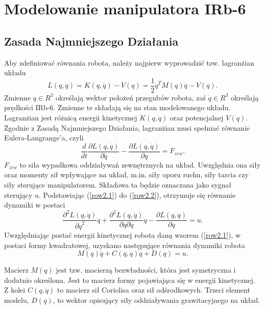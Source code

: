\documentclass[eng,printmode]{mgr}
\begin{document}
\chapter{Modelowanie manipulatora IRb-6}

\section{Zasada Najmniejszego Działania}



Aby zdefiniować równania robota, należy najpierw wyprowadzić tzw. lagranżian układu
\begin{equation}\label{row2.1}
L(q,\dot{q})=K(q,\dot{q})-V(q)=\frac{1}{2}\dot{q}^TM(q)\dot{q}-V(q).
\end{equation}
Zmienne $q ∈ R^3$ określają wektor położeń przegubów robota, zaś  $\dot{q} ∈ R^3 $ określają prędkości IRb-6. Zmienne te składają się na stan modelowanego układu. Lagranżian jest różnicą energii kinetycznej $K(q,\dot{q})$ oraz potencjalnej $V(q)$. Zgodnie z Zasadą Najmniejszego Działania, lagranżian musi spełniać równanie Eulera-Langrange'a, czyli
\begin{equation}\label{row2.2}
\frac{d}{dt}  \frac{∂L(q,\dot{q})}{∂\dot{q}} - \frac{∂L(q,\dot{q})}{∂q}=F_{zew}.
\end{equation}
$F_{zew}$ to siła wypadkowa oddziaływań zewnętrznych na układ. Uwzględnia ona siły oraz momenty sił wpływające na układ, m.in. siły oporu ruchu, siły tarcia czy siły sterujące manipulatorem. Składowa ta będzie oznaczana jako sygnał sterujący $u$. Podstawiając (\ref{row2.1}) do (\ref{row2.2}), otrzymuje się równanie dynamiki w postaci
\begin{equation}\label{row2.3}
 \frac{∂^2L(q,\dot{q})}{∂\dot{q}^2}\ddot{q} +\frac{∂^2L(q,\dot{q})}{∂q∂\dot{q}}\dot{q} - \frac{∂L(q,\dot{q})}{∂q}=u.
\end{equation}
 Uwzględniając postać energii kinetycznej robota daną wzorem (\ref{row2.1}), w postaci formy kwadratowej, uzyskano następujące równania dynamiki robota
\begin{equation}\label{row2.4}
M(q)\ddot{q}+C(q, \dot{q})\dot{q} + D(q)=u.
\end{equation}


Macierz $M(q)$ jest tzw. macierzą bezwładności, która jest symetryczna i dodatnio określona. Jest to macierz formy pojawiająca się w energii kinetycznej. Z kolei $C(q,\dot{q})$  to macierz sił Coriolisa oraz sił odśrodkowych. Trzeci element modelu, $D(q)$, to wektor opisujący siły oddziaływania grawitacyjnego na układ. 
\newpage
\end{document}
